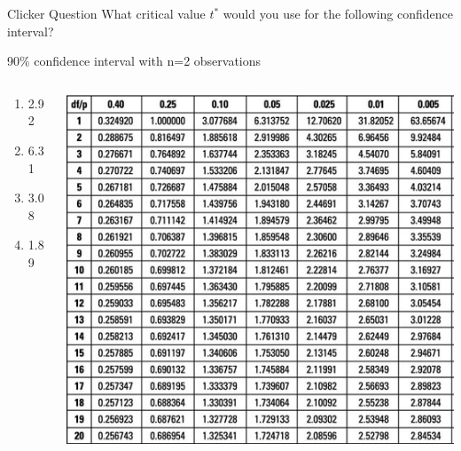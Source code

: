 \documentclass{beamer}
\begin{document}
\begin{frame}{Clicker Question}
	What critical value $t^*$ would you use for the following confidence interval?
	
	\begin{center}
		90\% confidence interval with n=2 observations
	\end{center}

	\begin{columns}
		\begin{column}{0.3\textwidth}
			\begin{enumerate}[label=(\alph*)]
				\item 2.92
				\item 6.31
				\item 3.08
				\item 1.89
			\end{enumerate}
		\end{column}

		\begin{column}{0.7\textwidth} 
			\begin{center}
			 	\includegraphics[width=\textwidth]{t_table3}
			\end{center}
		\end{column}
	\end{columns}
\end{frame}
\end{document}

